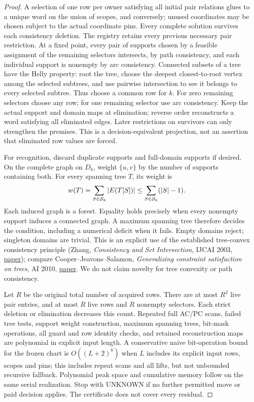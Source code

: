 \documentclass[11pt]{article}
\begin{document}
\begin{proof}
A selection of one row per owner satisfying all initial pair relations glues to a unique word on the union of scopes, and conversely; unused coordinates may be chosen subject to the actual coordinate pins. Every complete solution survives each consistency deletion. The registry retains every previous necessary pair restriction. At a fixed point, every pair of supports chosen by a feasible assignment of the remaining selectors intersects, by path consistency, and each individual support is nonempty by arc consistency. Connected subsets of a tree have the Helly property: root the tree, choose the deepest closest-to-root vertex among the selected subtrees, and use pairwise intersection to see it belongs to every selected subtree. Thus choose a common row for $k$. For zero remaining selectors choose any row; for one remaining selector use arc consistency. Keep the actual support and domain maps at elimination; reverse order reconstructs a word satisfying all eliminated edges. Later restrictions on survivors can only strengthen the premises. This is a decision-equivalent projection, not an assertion that eliminated row values are forced.

For recognition, discard duplicate supports and full-domain supports if desired. On the complete graph on $D_k$, weight $\{u,v\}$ by the number of supports containing both. For every spanning tree $T$, its weight is
\[
 w(T)=\sum_{S\in{\cal S}_k}|E(T[S])|
 \le \sum_{S\in{\cal S}_k}(|S|-1).
\]
Each induced graph is a forest. Equality holds precisely when every nonempty support induces a connected graph. A maximum spanning tree therefore decides the condition, including a numerical deficit when it fails. Empty domains reject; singleton domains are trivial. This is an explicit use of the established tree-convex consistency principle (Zhang, \emph{Consistency and Set Intersection}, IJCAI 2003, \href{https://ijcai.org/proceedings/2003/39}{paper}); compare Cooper--Jeavons--Salamon, \emph{Generalizing constraint satisfaction on trees}, AI 2010, \href{https://www.cs.ox.ac.uk/publications/publication4995-abstract.html}{paper}. We do not claim novelty for tree convexity or path consistency.

Let $R$ be the original total number of acquired rows. There are at most $R^2$ live pair entries, and at most $R$ live rows and $R$ nonempty selectors. Each strict deletion or elimination decreases this count. Repeated full AC/PC scans, failed tree tests, support weight construction, maximum spanning trees, bit-mask operations, all guard and row identity checks, and retained reconstruction maps are polynomial in explicit input length. A conservative naive bit-operation bound for the frozen chart is $O((L+2)^8)$ when $L$ includes its explicit input rows, scopes and pins; this includes repeat scans and all lifts, but not unbounded recursive fallback. Polynomial peak space and cumulative memory follow on the same serial realization. Stop with UNKNOWN if no further permitted move or paid decision applies. The certificate does not cover every residual.
\end{proof}
\end{document}
